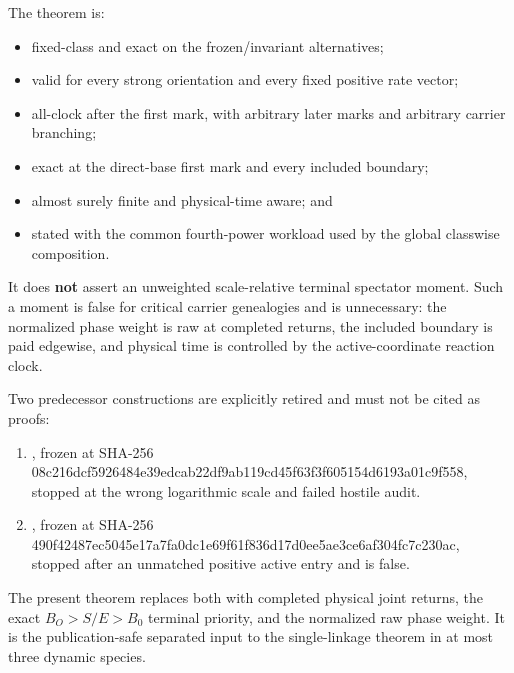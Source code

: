 The theorem is:

\begin{itemize}
\tightlist
\item
  fixed-class and exact on the frozen/invariant alternatives;
\item
  valid for every strong orientation and every fixed positive rate
  vector;
\item
  all-clock after the first mark, with arbitrary later marks and
  arbitrary carrier branching;
\item
  exact at the direct-base first mark and every included boundary;
\item
  almost surely finite and physical-time aware; and
\item
  stated with the common fourth-power workload used by the global
  classwise composition.
\end{itemize}

It does \textbf{not} assert an unweighted scale-relative terminal
spectator moment. Such a moment is false for critical carrier
genealogies and is unnecessary: the normalized phase weight is raw at
completed returns, the included boundary is paid edgewise, and physical
time is controlled by the active-coordinate reaction clock.

Two predecessor constructions are explicitly retired and must not be
cited as proofs:

\begin{enumerate}
\def\labelenumi{\arabic{enumi}.}
\tightlist
\item
  \texttt{}, frozen at
  SHA-256
  08c216dcf5926484e39edcab22df9ab119cd45f63f3f605154d6193a01c9f558,
  stopped at the wrong logarithmic scale and failed hostile audit.
\item
  \texttt{},
  frozen at SHA-256
  490f42487ec5045e17a7fa0dc1e69f61f836d17d0ee5ae3ce6af304fc7c230ac,
  stopped after an unmatched positive active entry and is false.
\end{enumerate}

The present theorem replaces both with completed physical joint returns,
the exact \(B_O>S/E>B_0\) terminal priority, and the normalized raw
phase weight. It is the publication-safe separated input to the
single-linkage theorem in at most three dynamic species.
